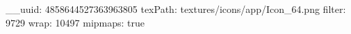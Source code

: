 __uuid: 4858644527363963805
texPath: textures/icons/app/Icon_64.png
filter: 9729
wrap: 10497
mipmaps: true